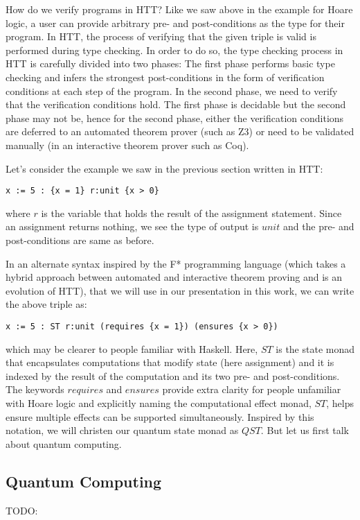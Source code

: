 \documentclass[adraft,creativecommons]{eptcs}
\begin{document}
How do we verify programs in HTT? Like we saw above in the example for Hoare logic, a user can provide arbitrary pre- and post-conditions as the type for their program. In HTT, the process of verifying that the given triple is valid is performed during type checking. In order to do so, the type checking process in HTT is carefully divided into two phases: The first phase performs basic type checking and infers the strongest post-conditions in the form of verification conditions at each step of the program. In the second phase, we need to verify that the verification conditions hold. The first phase is decidable but the second phase may not be, hence for the second phase, either the verification conditions are deferred to an automated theorem prover (such as Z3) or need to be validated manually (in an interactive theorem prover such as Coq).

Let's consider the example we saw in the previous section written in HTT:
\begin{lstlisting}[language=QHaskell]
    x := 5 : {x = 1} r:unit {x > 0}
\end{lstlisting}
where $r$ is the variable that holds the result of the assignment statement. Since an assignment returns nothing, we see the type of output is $unit$ and the pre- and post-conditions are same as before.

In an alternate syntax inspired by the F* programming language (which takes a hybrid approach between automated and interactive theorem proving and is an evolution of HTT), that we will use in our presentation in this work, we can write the above triple as:
\begin{lstlisting}[language=QHaskell]
    x := 5 : ST r:unit (requires {x = 1}) (ensures {x > 0})
\end{lstlisting}
which may be clearer to people familiar with Haskell. Here, $ST$ is the state monad that encapsulates computations that modify state (here assignment) and it is indexed by the result of the computation and its two pre- and post-conditions. The keywords $requires$ and $ensures$ provide extra clarity for people unfamiliar with Hoare logic and explicitly naming the computational effect monad, $ST$, helps ensure multiple effects can be supported simultaneously. Inspired by this notation, we will christen our quantum state monad as $QST$. But let us first talk about quantum computing.

\subsection{Quantum Computing}
TODO:
\end{document}
